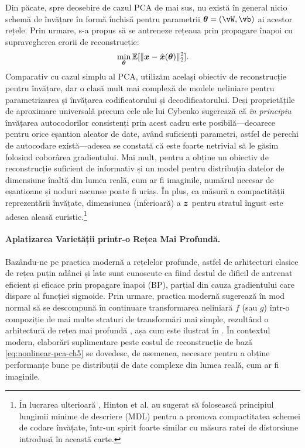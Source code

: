 \documentclass[../../book-main_ro.tex]{subfiles}
\begin{document}
Din păcate, spre deosebire de cazul PCA de mai sus, nu există în general nicio
schemă de învățare în formă închisă pentru parametrii $\boldsymbol{\theta} =
(\vW, \vb)$ ai acestor rețele. Prin urmare, s-a propus să se antreneze
rețeaua prin propagare înapoi cu supravegherea erorii de reconstrucție:
\begin{equation}\label{eq:nonlinear-pca-ch5}
  \min_{\boldsymbol{\theta}} \mathbb{E}[ \|\bm{x} - \hat{\bm{x}}(\boldsymbol{\theta})\|_2^2].
\end{equation}
Comparativ cu cazul simplu al PCA, utilizăm același obiectiv de reconstrucție
pentru învățare, dar o clasă mult mai complexă de modele neliniare pentru
parametrizarea și învățarea codificatorului și decodificatorului. Deși proprietățile
de aproximare universală precum cele ale lui Cybenko sugerează că \textit{în principiu}
învățarea autocodorilor consistenți prin acest cadru este posibilă---deoarece pentru
orice eșantion aleator de date, având suficienți parametri, astfel de perechi de autocodare
există---adesea se constată că este foarte netrivial să le găsim folosind coborârea gradientului.
Mai mult, pentru a obține un obiectiv de reconstrucție suficient de informativ
și un model pentru
distribuția datelor de dimensiune înaltă din lumea reală, cum ar fi imaginile, numărul necesar
de eșantioane și noduri ascunse poate fi uriaș.
În plus, ca măsură a compactității reprezentării învățate,
dimensiunea (inferioară) a $\bm{z}$ pentru stratul îngust este adesea aleasă
euristic.\footnote{În lucrarea ulterioară \cite{Hinton-1993}, Hinton et al. au sugerat să folosească principiul lungimii minime de descriere (MDL) pentru a promova
  compactitatea schemei de codare învățate, într-un spirit foarte similar cu
măsura ratei de distorsiune introdusă în această carte.}

\paragraph{Aplatizarea Varietății printr-o Rețea Mai Profundă.}
Bazându-ne pe practica modernă a rețelelor profunde, astfel de arhitecturi clasice de rețea
puțin adânci și late sunt cunoscute ca fiind destul de dificil de
antrenat eficient și eficace prin propagare înapoi (BP), parțial
din cauza gradientului care dispare al funcției sigmoide. Prin urmare,
practica modernă sugerează în mod normal să se descompună în continuare
transformarea neliniară $f$ (sau $g$) într-o compoziție de
mai multe straturi de transformări mai simple, rezultând o arhitectură de rețea mai profundă
\cite{Hinton504}, așa cum este ilustrat în .
În contextul modern, elaborări suplimentare peste costul de reconstrucție de bază
\eqref{eq:nonlinear-pca-ch5} se dovedesc, de asemenea, necesare pentru a obține performanțe bune pe
distribuții de date complexe din lumea reală, cum ar fi imaginile.
\end{document}
